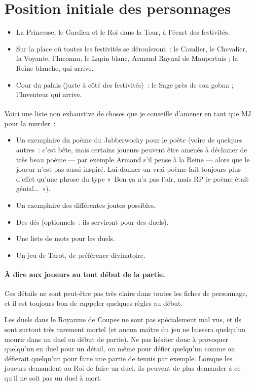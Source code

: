 {\section{Position initiale des personnages}
\begin{itemize}
	\item La Princesse, le Gardien et le Roi dans la Tour, à l’écart des festivités.
	\item Sur la place où toutes les festivités se dérouleront~:  le Cavalier, le Chevalier, la Voyante, l’Inconnu, le Lapin blanc, Armand Raynal de Maupertuis ; la Reine blanche, qui arrive.
	\item Cour du palais (juste à côté des festivités)~:  le Sage près de son goban ; l’Inventeur qui arrive.
\end{itemize}

\paragraph{}{
Voici une liste non exhaustive de choses que je conseille d’amener en tant que MJ pour la murder~:
\begin{itemize}
	\item Un exemplaire du poème du Jabberwocky pour le poète (voire de quelques autres~:  c’est bête, mais certains joueurs peuvent être amenés à déclamer de très beau poème — par exemple Armand s’il pense à la Reine — alors que le joueur n’est pas aussi inspiré.  Lui donner un vrai poème fait toujours plus d’effet qu’une phrase du type «~Bon ça n’a pas l’air, mais RP le poème était génial…~»).
	\item Un exemplaire des différentes joutes possibles.
	\item Des dés (optionnels~:  ils serviront pour des duels).
	\item Une liste de mots pour les duels.
	\item Un jeu de Tarot, de préférence divinatoire.
\end{itemize}
}

\paragraph{À dire aux joueurs au tout début de la partie.}{
	Ces détails ne sont peut-être pas très clairs dans toutes les fiches de personnage, et il est toujours bon de rappeler quelques règles au début.

	Les duels dans le Royaume de Coupes ne sont pas spécialement mal vus, et ils sont surtout très rarement mortel (et aucun maître du jeu ne laissera quelqu’un mourir dans un duel en début de partie).
	Ne pas hésiter donc à provoquer quelqu’un en duel pour un détail, ou même pour défier quelqu’un comme on défierait quelqu’un pour faire une partie de tennis par exemple.
	Lorsque les joueurs demandent au Roi de faire un duel, ils peuvent de plus demander à ce qu’il ne soit pas un duel à mort.

}}
